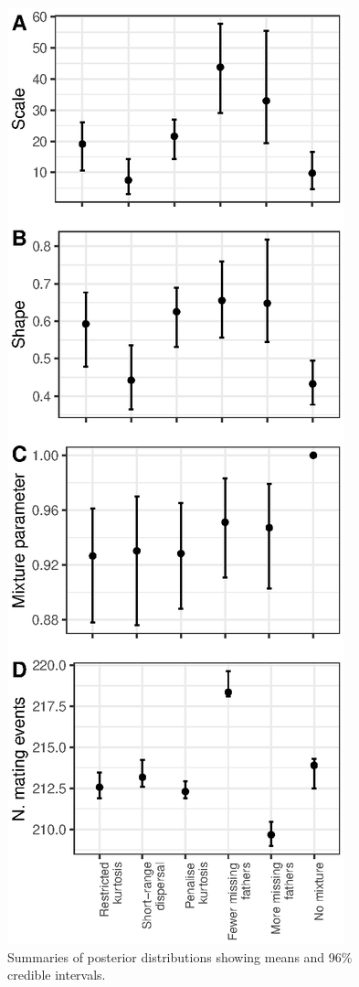 \documentclass[10pt, a4paper, twocolumn]{article} %
\begin{document}
\begin{figure}
\includegraphics{posterior_distributions.eps}
\caption{Summaries of posterior distributions showing means and 96\% credible intervals.}
\label{fig:posterior_summaries}
\end{figure}
\end{document}
